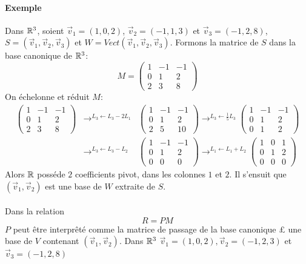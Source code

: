 {\paragraph{Exemple} Dans $\mathbb{R}^3$, soient $\vec{v}_1 = (1, 0, 2)$, $\vec{v}_2 = (-1, 1, 3)$ et $\vec{v}_3 = (-1, 2, 8)$, $S = (\vec{v}_1, \vec{v}_2, \vec{v}_3)$ et $W = Vect(\vec{v}_1, \vec{v}_2, \vec{v}_3)$. Formons la matrice de $S$ dans la base canonique de $\mathbb{R}^3$:
$$M = \begin{pmatrix}
  1 & -1 & -1 \\
  0 & 1 & 2 \\
  2 & 3 & 8
\end{pmatrix}$$
On échelonne et réduit $M$:
\begin{eqnarray*}
  \begin{pmatrix}
    1 & -1 & -1 \\
    0 & 1 & 2 \\
    2 & 3 & 8
  \end{pmatrix}
  &\rightarrow^{L_3 \leftarrow L_3 - 2 L_1}&
  \begin{pmatrix}
    1 & -1 & -1 \\
    0 & 1 & 2 \\
    2 & 5 & 10
  \end{pmatrix}
  \rightarrow^{L_3 \leftarrow \frac{1}{5} L_3}
  \begin{pmatrix}
    1 & -1 & -1 \\
    0 & 1 & 2 \\
    0 & 1 & 2
  \end{pmatrix}
  \\
  &\rightarrow^{L_3 \leftarrow L_3 - L_2}&
  \begin{pmatrix}
    1 & -1 & -1 \\
    0 & 1 & 2 \\
    0 & 0 & 0
  \end{pmatrix}
  \rightarrow^{L_1 \leftarrow L_1 + L_2}
  \begin{pmatrix}
    1 & 0 & 1 \\
    0 & 1 & 2 \\
    0 & 0 & 0
  \end{pmatrix}
\end{eqnarray*}
Alors $\mathbb{R}$ posséde $2$ coefficients pivot, dans les colonnes $1$ et $2$. Il s'ensuit que $(\vec{v}_1, \vec{v}_2)$ est une base de $W$ extraite de $S$. 
\\\\
Dans la relation
$$R = P M$$
$P$ peut être interprêté comme la matrice de passage de la base canonique £ une base de $V$ contenant $(\vec{v}_1, \vec{v}_2)$. Dans $\mathbb{R}^3$ $\vec{v}_1 = (1, 0, 2), \vec{v}_2 = (-1, 2, 3)$ et $\vec{v}_3 = (-1, 2, 8)$
}
